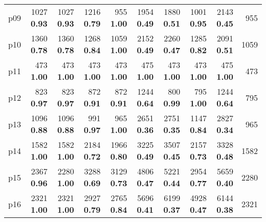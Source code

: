 \begin{tabular}{|l|rrrrrrrr|r|}
p09 & {\footnotesize 1027} \textbf{0.93} & {\footnotesize 1027} \textbf{0.93} & {\footnotesize 1216} \textbf{0.79} & {\footnotesize 955} \textbf{1.00} & {\footnotesize 1954} \textbf{0.49} & {\footnotesize 1880} \textbf{0.51} & {\footnotesize 1001} \textbf{0.95} & {\footnotesize 2143} \textbf{0.45} & 955\\
p10 & {\footnotesize 1360} \textbf{0.78} & {\footnotesize 1360} \textbf{0.78} & {\footnotesize 1268} \textbf{0.84} & {\footnotesize 1059} \textbf{1.00} & {\footnotesize 2152} \textbf{0.49} & {\footnotesize 2260} \textbf{0.47} & {\footnotesize 1285} \textbf{0.82} & {\footnotesize 2091} \textbf{0.51} & 1059\\
p11 & {\footnotesize 473} \textbf{1.00} & {\footnotesize 473} \textbf{1.00} & {\footnotesize 473} \textbf{1.00} & {\footnotesize 473} \textbf{1.00} & {\footnotesize 475} \textbf{1.00} & {\footnotesize 473} \textbf{1.00} & {\footnotesize 473} \textbf{1.00} & {\footnotesize 475} \textbf{1.00} & 473\\
p12 & {\footnotesize 823} \textbf{0.97} & {\footnotesize 823} \textbf{0.97} & {\footnotesize 872} \textbf{0.91} & {\footnotesize 872} \textbf{0.91} & {\footnotesize 1244} \textbf{0.64} & {\footnotesize 800} \textbf{0.99} & {\footnotesize 795} \textbf{1.00} & {\footnotesize 1244} \textbf{0.64} & 795\\
p13 & {\footnotesize 1096} \textbf{0.88} & {\footnotesize 1096} \textbf{0.88} & {\footnotesize 991} \textbf{0.97} & {\footnotesize 965} \textbf{1.00} & {\footnotesize 2651} \textbf{0.36} & {\footnotesize 2751} \textbf{0.35} & {\footnotesize 1147} \textbf{0.84} & {\footnotesize 2827} \textbf{0.34} & 965\\
p14 & {\footnotesize 1582} \textbf{1.00} & {\footnotesize 1582} \textbf{1.00} & {\footnotesize 2184} \textbf{0.72} & {\footnotesize 1966} \textbf{0.80} & {\footnotesize 3225} \textbf{0.49} & {\footnotesize 3507} \textbf{0.45} & {\footnotesize 2157} \textbf{0.73} & {\footnotesize 3328} \textbf{0.48} & 1582\\
p15 & {\footnotesize 2367} \textbf{0.96} & {\footnotesize 2280} \textbf{1.00} & {\footnotesize 3288} \textbf{0.69} & {\footnotesize 3129} \textbf{0.73} & {\footnotesize 4806} \textbf{0.47} & {\footnotesize 5221} \textbf{0.44} & {\footnotesize 2954} \textbf{0.77} & {\footnotesize 5659} \textbf{0.40} & 2280\\
p16 & {\footnotesize 2321} \textbf{1.00} & {\footnotesize 2321} \textbf{1.00} & {\footnotesize 2927} \textbf{0.79} & {\footnotesize 2765} \textbf{0.84} & {\footnotesize 5696} \textbf{0.41} & {\footnotesize 6199} \textbf{0.37} & {\footnotesize 4928} \textbf{0.47} & {\footnotesize 6144} \textbf{0.38} & 2321\\

\end{tabular}
